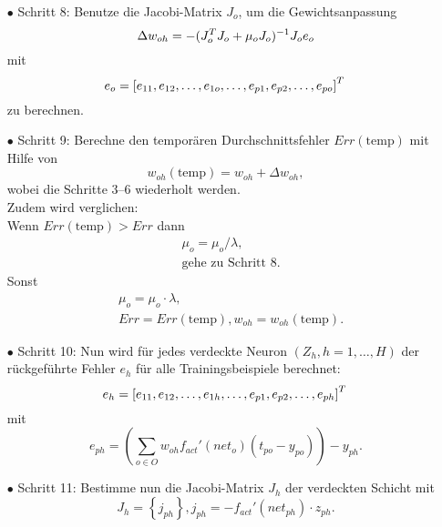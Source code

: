 \begin{itemize}
\item[\textbf{$\bullet$}] Schritt 8: Benutze die Jacobi-Matrix $J_{o}$, um die Gewichtsanpassung
\begin{equation}
\Delta w_{oh}=-(J_{o}^T J_{o} + \mu_{o} J_{o})^{-1} J_{o} e_{o}\\
\end{equation}
mit
\begin{equation}
e_{o}= \left [ e_{11}, e_{12}, \dots, e_{1o}, \dots, e_{p1}, e_{p2}, \dots, e_{po} \right ]^T\\
\end{equation}
zu berechnen.

\item[\textbf{$\bullet$}] Schritt 9: Berechne den temporären Durchschnittsfehler $Err(\text{temp})$ mit Hilfe von
\begin{equation}
w_{oh}(\text{temp})= w_{oh} + \Delta w_{oh},
\end{equation}
wobei die Schritte 3--6 wiederholt werden.\\
Zudem wird verglichen:\\
Wenn $Err(\text{temp}) > Err$ dann
\begin{align*}
&\mu_o = \mu_o / \lambda, \\
&\text{gehe zu Schritt 8.}
\end{align*}
Sonst
\begin{align*}
&\mu_o = \mu_o \cdot \lambda, \\
&Err=Err(\text{temp}), w_{oh}=w_{oh}(\text{temp}).
\end{align*}

\item[\textbf{$\bullet$}] Schritt 10: Nun wird für jedes verdeckte Neuron $(Z_h,h=1,\dots,H)$ der rückgeführte Fehler $e_{h}$ für alle Trainingsbeispiele berechnet:
\begin{equation}
e_{h}= \left [ e_{11}, e_{12}, \dots, e_{1h}, \dots, e_{p1}, e_{p2}, \dots, e_{ph} \right ]^T\\
\end{equation}
mit
\begin{equation}
e_{ph} = \left (    \sum\limits_{o \in O} w_{oh} f_{act}'(net_{o}) (t_{po}-y_{po})  \right )  - y_{ph}.
\end{equation}


\item[\textbf{$\bullet$}] Schritt 11: Bestimme nun die Jacobi-Matrix $J_{h}$ der verdeckten Schicht mit
\begin{equation}
J_{h}= \left \{ j_{ph} \right \}, j_{ph}=-f_{act}'(net_{ph}) \cdot z_{ph}.
\end{equation}


\end{itemize}
